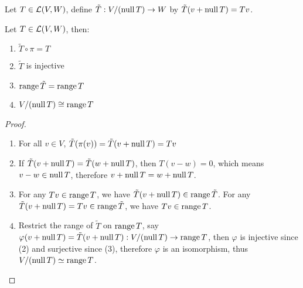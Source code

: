 \documentclass[../main.tex]{subfiles}
\begin{document}
\setcounter{definition}{\value{theorem}}
\begin{definition}
  Let $T \in \mathcal{L}(V, W)$, define $\tilde{T} : V / (\operatorname{null} T) \rightarrow W$ by
  $\tilde{T}(v + \operatorname{null} T) = Tv$.
\end{definition}

\setcounter{theorem}{\value{definition}}
\begin{theorem}
  Let $T \in \mathcal{L}(V, W)$, then:
  \begin{enumerate}
    \item $\tilde{T} \circ \pi = T$
    \item $\tilde{T}$ is injective
    \item $\operatorname{range} \tilde{T} = \operatorname{range} T$
    \item $V / (\operatorname{null} T) \cong \operatorname{range} T$
  \end{enumerate}
\end{theorem}
\begin{proof}
  ~
  \begin{enumerate}
    \item For all $v \in V$, $\tilde{T}(\pi(v)) = \tilde{T}(v + \operatorname{null} T) = Tv$
    \item If $\tilde{T}(v + \operatorname{null} T) = \tilde{T}(w + \operatorname{null} T)$, then $T(v - w) = 0$,
          which means $v - w \in \operatorname{null} T$, therefore $v + \operatorname{null} T = w + \operatorname{null} T$.
    \item For any $Tv \in \operatorname{range} T$, we have $\tilde{T}(v + \operatorname{null} T) \in \operatorname{range} \tilde{T}$.
          For any $\tilde{T}(v + \operatorname{null} T) = Tv \in \operatorname{range} \tilde{T}$, we have $Tv \in \operatorname{range} T$.
    \item Restrict the range of $\tilde{T}$ on $\operatorname{range} T$, say $\varphi(v + \operatorname{null} T) = \tilde{T}(v + \operatorname{null} T) : V / (\operatorname{null} T) \rightarrow \operatorname{range} T$,
          then $\varphi$ is injective since (2) and surjective since (3),
          therefore $\varphi$ is an isomorphism, thus $V / (\operatorname{null} T) \simeq \operatorname{range} T$.
  \end{enumerate}
\end{proof}
\end{document}
